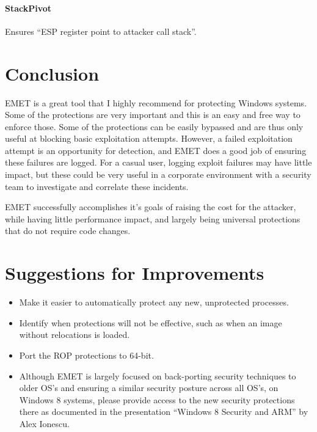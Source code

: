 \documentclass[]{article}
\begin{document}
\paragraph{StackPivot}\label{stackpivot}
Ensures ``ESP register point to attacker call stack''\cite{defcon_emet_pki}.















\section{Conclusion}
EMET is a great tool that I highly recommend for protecting Windows systems.  Some of the protections are very important and this is an easy and free way to enforce those.  Some of the protections can be easily bypassed and are thus only useful at blocking basic exploitation attempts.  However, a failed exploitation attempt is an opportunity for detection, and EMET does a good job of ensuring these failures are logged.  For a casual user, logging exploit failures may have little impact, but these could be very useful in a corporate environment with a security team to investigate and correlate these incidents.  

EMET successfully accomplishes it's goals of raising the cost for the attacker, while having little performance impact, and largely being universal protections that do not require code changes.


\section{Suggestions for Improvements}\label{suggestions-for-improvements}
\begin{itemize}
  \item Make it easier to automatically protect any new, unprotected processes.
  \item Identify when protections will not be effective, such as when an image without relocations is loaded.
  \item Port the ROP protections to 64-bit.
  \item Although EMET is largely focused on back-porting security techniques to older OS's and ensuring a similar security posture across all OS's, on Windows 8 systems, please provide access to the new security protections there as documented in the presentation ``Windows 8 Security and ARM'' by Alex Ionescu\cite{windows_ionescu}.
\end{itemize}
\end{document}
